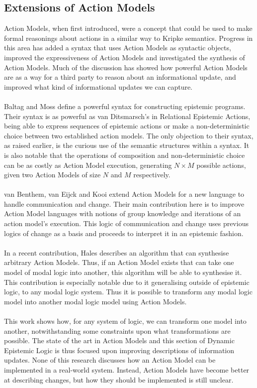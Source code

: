\documentclass[12pt, a4paper, titlepage]{scrartcl}
\begin{document}
\subsection{Extensions of Action Models}
Action Models, when first introduced, were a concept that could be used to make
formal reasonings about actions in a similar way to Kripke semantics.
Progress in this area has added a syntax that uses Action Models as syntactic
objects, improved the expressiveness of Action Models and investigated the
synthesis of Action Models.
Much of the discussion has showed how powerful Action Models are as a way for a
third party to reason about an informational update, and improved what kind of
informational updates we can capture.\\
\\
Baltag and Moss define a powerful syntax for constructing epistemic programs.
Their syntax is as powerful as van Ditsmarsch's in Relational Epistemic Actions,
being able to express sequences of epistemic actions or make a non-deterministic
choice between two established action models.
The only objection to their syntax, as raised earlier, is the curious use of
the semantic structures within a syntax.
It is also notable that the operations of composition and non-deterministic
choice can be as costly as Action Model execution, generating $N \times M$
possible actions, given two Action Models of size $N$ and $M$
respectively.\citep{baltag2005programs}\\
\\
van Benthem, van Eijck and Kooi extend Action Models for a new language to
handle communication and change.
Their main contribution here is to improve Action Model languages with notions
of group knowledge and iterations of an action model's execution.
This logic of communication and change uses previous logics of change as a basis
and proceeds to interpret it in an epistemic fashion.\citep{benthem2006lcc}\\
\\
In a recent contribution, Hales describes an algorithm that can synthesise arbitrary
Action Models.
Thus, if an Action Model exists that can take one model of modal logic into
another, this algorithm will be able to synthesise it.
This contribution is especially notable due to it generalising outside of
epistemic logic, to any modal logic system.
Thus it is possible to transform any modal logic model into another modal logic
model using Action Models.\citep{hales13synthesis}\\
\\
This work shows how, for any system of logic, we can transform one model into
another, notwithstanding some constraints upon what transformations are
possible.
The state of the art in Action Models and this section of Dynamic Epistemic
Logic is thus focused upon improving descriptions of information updates.
None of this research discusses how an Action Model can be implemented in a
real-world system.
Instead, Action Models have become better at describing changes, but how they
should be implemented is still unclear.
\end{document}

